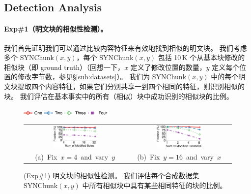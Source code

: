 \subsection{Detection Analysis}
\label{sub:evaluation-detection}



\paragraph{Exp\#1（明文块的相似性检测）。}
我们首先证明我们可以通过比较内容特征来有效地找到相似的明文块。 我们考虑多个 SYNChunk$(x, y)$，每个 SYNChunk$(x, y)$ 包括 10\,K 个从基本块修改的相似块（即 ground truth）（回想一下，$x$ 定义了修改位置的数量，$y$ 定义每个位置的修改字节数，参见\S\ref{sub:datasets}）。 我们为 SYNChunk$(x, y)$ 中的每个明文块提取四个内容特征，如果它们分别共享一到四个相同的特征，则识别相似的块。 我们评估在基本事实中的所有（相似）块中成功识别的相似块的比例。


\begin{figure}[t]
    \centering
    \includegraphics[width=0.4\textwidth]{pic/featurespy/plot/detection/syn/fixed_pq_legend.pdf}
    \vspace{5pt}\\
    \begin{tabular}{@{\ }c@{\ }c}
        \includegraphics[width=0.45\textwidth]{pic/featurespy/plot/detection/syn/fixed_p_4.pdf} &
        \includegraphics[width=0.45\textwidth]{pic/featurespy/plot/detection/syn/fixed_q_16.pdf}\\
        \mbox{\small (a) Fix $x=4$ and vary $y$}&
        \mbox{\small (b) Fix $y=16$ and vary $x$}\\
    \end{tabular}
    \vspace{-6pt}
    \caption{(Exp\#1) 明文块的相似性检测。 我们评估每个合成数据集 SYNChunk$(x, y)$ 中所有相似块中具有某些相同特征的块的比例。}
    \vspace{-6pt}
    \label{fig:expDetectionSynSim}
\end{figure}

